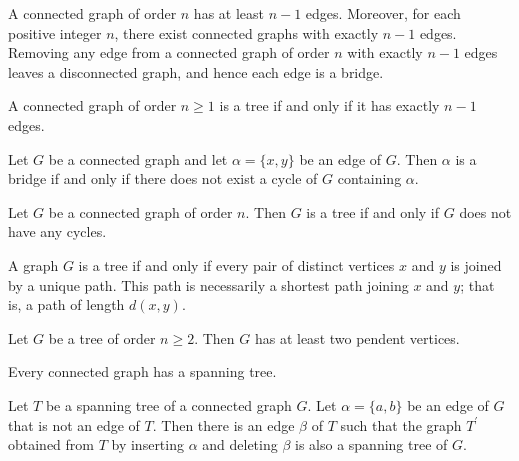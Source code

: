 \begin{theorem}
  \label{thm:11.5.1}
  A connected graph of order $n$ has at least $n - 1$ edges. Moreover, for each positive integer $n$, 
  there exist connected graphs with exactly $n - 1$ edges. Removing any edge from a connected graph 
  of order $n$ with exactly $n-1$ edges leaves a disconnected graph, and hence each edge is a bridge.
\end{theorem}

\begin{theorem}
  \label{thm:11.5.2}
  A connected graph of order $n \geq 1$ is a tree if and only if it has exactly $n - 1$ edges.
\end{theorem}

\begin{theorem}
  \label{thm:11.5.3}
  Let $G$ be a connected graph and let $\alpha = \{x,y\}$ be an edge of $G$. Then $\alpha$ is a 
  bridge if and only if there does not exist a cycle of $G$ containing $\alpha$.
\end{theorem}

\begin{theorem}
  \label{thm:11.5.4}
  Let $G$ be a connected graph of order $n$. Then $G$ is a tree if and only if $G$ does not have 
  any cycles.
\end{theorem}

\begin{theorem}
  \label{thm:11.5.5}
  A graph $G$ is a tree if and only if every pair of distinct vertices $x$ and $y$ is joined by a unique path. This path is necessarily a shortest path joining $x$ and $y$; that is, a path of 
  length $d(x, y)$.
\end{theorem}

\begin{theorem}
  \label{thm:11.5.6}
  Let $G$ be a tree of order $n \geq 2$. Then $G$ has at least two pendent vertices.
\end{theorem}

\begin{theorem}
  \label{thm:11.5.7}
  Every connected graph has a spanning tree.
\end{theorem}

\begin{theorem}
  \label{thm:11.5.8}
  Let $T$ be a spanning tree of a connected graph $G$. Let $\alpha = \{a,b\}$ be an edge of $G$ that
  is not an edge of $T$. Then there is an edge $\beta$ of $T$ such that the graph $T^{\prime}$ 
  obtained from $T$ by inserting $\alpha$ and deleting $\beta$ is also a spanning tree of $G$.
\end{theorem}

